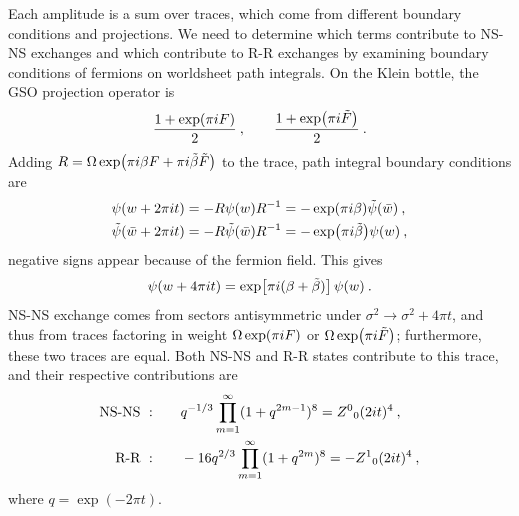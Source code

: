 	Each amplitude is a sum over traces, which come from different boundary conditions and projections. We need to determine which terms contribute to NS-NS exchanges and which contribute to R-R exchanges by examining boundary conditions of fermions on worldsheet path integrals. On the Klein bottle, the GSO projection operator is
	\begin{equation}
		\frac{1+\exp(\pi i F)}{2} \:,\qquad \frac{1+\exp(\pi i\tilde{F})}{2} \:. \label{10.8.7}
	\end{equation}
	Adding $R=\Omega \exp(\pi i\beta F +\pi i\tilde{\beta}\tilde{F})$ to the trace, path integral boundary conditions are
	\begin{subequations}
		\begin{align}
			\psi(w+2\pi i t)&= -R\psi(w)R^{-1} =-\exp(\pi i\beta)\tilde{\psi}(\bar{w}) \:, \label{10.8.8a} \\
			\tilde{\psi}(\bar{w}+2\pi i t)&= -R\tilde{\psi}(\bar{w})R^{-1} =-\exp(\pi i\tilde{\beta})\psi(w)\:,\label{10.8.8b}
		\end{align} \label{10.8.8}
	\end{subequations}
	negative signs appear because of the fermion field. This gives
	\begin{equation}
		\psi(w+4\pi i t) = \exp[\pi i(\beta+\tilde{\beta})]\,\psi(w) \:. \label{10.8.9}
	\end{equation}
	NS-NS exchange comes from sectors antisymmetric under $\sigma^{2}\to\sigma^{2}+4\pi t$, and thus from traces factoring in weight $\Omega\exp(\pi i F)$ or $\Omega\exp(\pi i\tilde{F})$; furthermore, these two traces are equal. Both NS-NS and R-R states contribute to this trace, and their respective contributions are
	\begin{subequations}
		\begin{align}
			\text{NS-NS }: \qquad &q^{-1/3}\prod_{m=1}^{\infty} (1+q^{2m-1})^{8} = Z^{0}{}_{0}(2i t)^{4} \:, \label{10.8.10a} \\
			\text{R-R }: \qquad &-16 q^{2/3} \prod_{m=1}^{\infty} (1+q^{2m})^{8} =- Z^{1}{}_{0}(2i t)^{4} \:,
			\label{10.8.10b}
		\end{align} \label{10.8.10}
	\end{subequations}
	where $q=\exp(-2\pi t)$.
	
